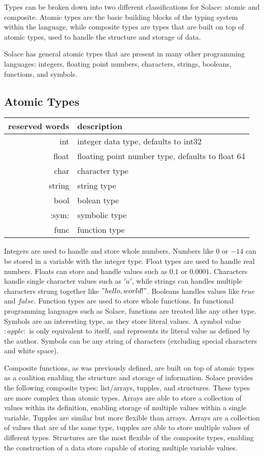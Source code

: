 \documentclass{article}
\begin{document}
Types can be broken down into two different classifications for Solace: atomic and composite. Atomic types are the basic
building blocks of the typing system within the language, while composite types are types that are built on top of atomic
types, used to handle the structure and storage of data.

Solace has general atomic types that are present in many other programming languages: integers, floating point numbers, characters,
strings, booleans, functions, and symbols.

\subsection{Atomic Types}
\begin{center}
\begin{tabular}{|r|l|}
	\hline
	reserved words & description \\
	\hline
	\hline
	int & integer data type, defaults to int32 \\
	float & floating point number type, defaults to float 64 \\
	char & character type \\
	string & string type \\
	bool & bolean type \\
	:sym: & symbolic type \\
	func & function type \\
	\hline
\end{tabular}
\end{center}

Integers are used to handle and store whole numbers. Numbers like $0$ or $-14$ can be stored in a variable with the integer type. Float
types are used to handle real numbers. Floats can store and handle values such as $0.1$ or $0.0001$. Characters handle single character
values such as $'a'$, while strings can handles multiple characters strung together like $"hello, world!"$. Booleans handles values like
$true$ and $false$. Function types are used to store whole functions. In functional programming languages such as Solace, functions are
treated like any other type. Symbols are an interesting type, as they store literal values. A symbol value $:apple:$ is only equivalent
to itself, and represents its literal value as defined by the author. Symbols can be any string of characters (excluding special
characters and white space).

Composite functions, as was previously defined, are built on top of atomic types as a coalition enabling the structure and storage of
information. Solace provides the following composite types: list/arrays, tupples, and structures. These types are more complex than
atomic types. Arrays are able to store a collection of values within its definition, enabling storage of multiple values within a single
variable. Tupples are similar but more flexible than arrays. Arrays are a collection of values that are of the same type, tupples are able
to store multiple values of different types. Structures are the most flexible of the composite types, enabling the construction of a data
store capable of storing multiple variable values.
\end{document}
